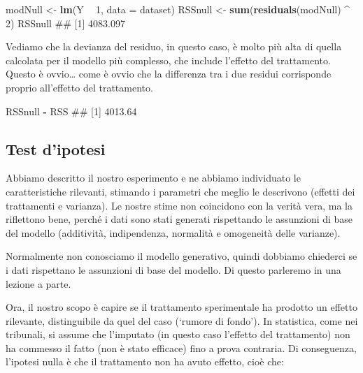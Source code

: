 \documentclass[a4paper,12pt,oneside]{book}
\newenvironment{Shaded}{\begin{snugshade}}{\end{snugshade}}
\newcommand{\KeywordTok}[1]{\textcolor[rgb]{0.13,0.29,0.53}{\textbf{#1}}}
\newcommand{\DataTypeTok}[1]{\textcolor[rgb]{0.13,0.29,0.53}{#1}}
\newcommand{\DecValTok}[1]{\textcolor[rgb]{0.00,0.00,0.81}{#1}}
\newcommand{\StringTok}[1]{\textcolor[rgb]{0.31,0.60,0.02}{#1}}
\newcommand{\OperatorTok}[1]{\textcolor[rgb]{0.81,0.36,0.00}{\textbf{#1}}}
\newcommand{\NormalTok}[1]{#1}
\theoremstyle{definition}
\theoremstyle{definition}
\theoremstyle{definition}
\theoremstyle{remark}
\begin{document}
\begin{Shaded}
\begin{Highlighting}[]
\NormalTok{modNull <-}\StringTok{ }\KeywordTok{lm}\NormalTok{(Y }\OperatorTok{~}\StringTok{ }\DecValTok{1}\NormalTok{, }\DataTypeTok{data =}\NormalTok{ dataset)}
\NormalTok{RSSnull <-}\StringTok{ }\KeywordTok{sum}\NormalTok{(}\KeywordTok{residuals}\NormalTok{(modNull) }\OperatorTok{^}\StringTok{ }\DecValTok{2}\NormalTok{)}
\NormalTok{RSSnull}
\NormalTok{## [1] 4083.097}
\end{Highlighting}
\end{Shaded}

Vediamo che la devianza del residuo, in questo caso, è molto più alta di
quella calcolata per il modello più complesso, che include l'effetto del
trattamento. Questo è ovvio\ldots{} come è ovvio che la differenza tra i
due residui corrisponde proprio all'effetto del trattamento.

\begin{Shaded}
\begin{Highlighting}[]
\NormalTok{RSSnull }\OperatorTok{-}\StringTok{ }\NormalTok{RSS}
\NormalTok{## [1] 4013.64}
\end{Highlighting}
\end{Shaded}

\subsection{Test d'ipotesi}\label{test-dipotesi}

Abbiamo descritto il nostro esperimento e ne abbiamo individuato le
caratteristiche rilevanti, stimando i parametri che meglio le descrivono
(effetti dei trattamenti e varianza). Le nostre stime non coincidono con
la verità vera, ma la riflettono bene, perché i dati sono stati generati
rispettando le assunzioni di base del modello (additività, indipendenza,
normalità e omogeneità delle varianze).

Normalmente non conosciamo il modello generativo, quindi dobbiamo
chiederci se i dati rispettano le assunzioni di base del modello. Di
questo parleremo in una lezione a parte.

Ora, il nostro scopo è capire se il trattamento sperimentale ha prodotto
un effetto rilevante, distinguibile da quel del caso (`rumore di
fondo'). In statistica, come nei tribunali, si assume che l'imputato (in
questo caso l'effetto del trattamento) non ha commesso il fatto (non è
stato efficace) fino a prova contraria. Di conseguenza, l'ipotesi nulla
è che il trattamento non ha avuto effetto, cioè che:
\end{document}
